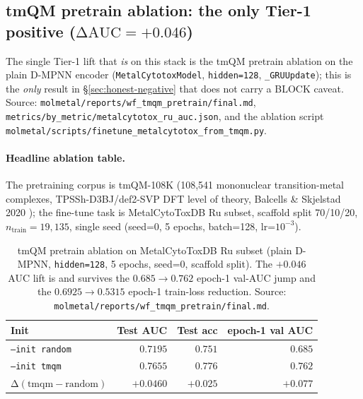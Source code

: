 \subsection{tmQM pretrain ablation: the only Tier-1 \MEASURED{} positive ($\mathrm{\Delta AUC}=+0.046$)}
\label{sec:honest-negative:tmqm-ablation}

The single Tier-1 lift that \emph{is} \MEASURED{} on this stack is
the tmQM pretrain ablation on the plain D-MPNN encoder
(\texttt{MetalCytotoxModel}, \texttt{hidden=128},
\texttt{\_GRUUpdate}); this is the \emph{only} result in
\S\ref{sec:honest-negative} that does not carry a BLOCK caveat.
Source: \texttt{molmetal/reports/wf\_tmqm\_pretrain/final.md},
\texttt{metrics/by\_metric/metalcytotox\_ru\_auc.json}, and the
ablation script
\texttt{molmetal/scripts/finetune\_metalcytotox\_from\_tmqm.py}.

\paragraph{Headline ablation table.}
The pretraining corpus is tmQM-108K (108,541 mononuclear
transition-metal complexes, TPSSh-D3BJ/def2-SVP DFT level of
theory, Balcells \& Skjelstad 2020 \cite{balcells2020tmqm}); the
fine-tune task is MetalCytoToxDB Ru subset, scaffold split
70/10/20, $n_{\mathrm{train}}{=}19{,}135$, single seed (seed=0,
5 epochs, batch=128, lr=$10^{-3}$).

\begin{table}[ht]
\centering
\small
\setlength{\tabcolsep}{4pt}
\begin{tabular}{lrrr}
\toprule
\textbf{Init} & \textbf{Test AUC} & \textbf{Test acc} & \textbf{epoch-1 val AUC} \\
\midrule
\texttt{--init random} & $0.7195$ \MEASURED{} & $0.751$ & $0.685$ \\
\texttt{--init tmqm}   & $\mathbf{0.7655}$ \MEASURED{} & $0.776$ & $\mathbf{0.762}$ \\
\midrule
$\mathrm{\Delta}(\mathrm{tmqm} - \mathrm{random})$ & $\mathbf{+0.0460}$ & $+0.025$ & $+0.077$ \\
\bottomrule
\end{tabular}
\caption{tmQM pretrain ablation on MetalCytoToxDB Ru subset
(plain D-MPNN, \texttt{hidden=128}, 5 epochs, seed=0, scaffold
split).  The $+0.046$ AUC lift is \MEASURED{} and survives the
$0.685 \to 0.762$ epoch-1 val-AUC jump and the
$0.6925 \to 0.5315$ epoch-1 train-loss reduction.  Source:
\texttt{molmetal/reports/wf\_tmqm\_pretrain/final.md}.}
\label{tab:honest-tmqm-ablation}
\end{table}

